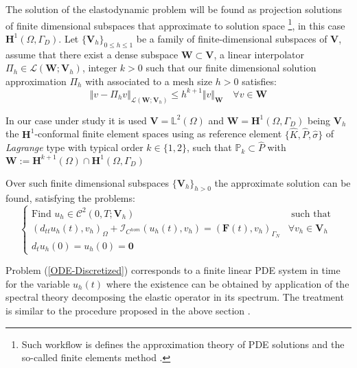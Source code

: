 The solution of the elastodynamic problem will be found as projection solutions of finite dimensional subspaces that approximate to solution space \footnote{Such workflow is defines the approximation theory of PDE solutions and the so-called finite elements method \cite{ern2004theory}.}, in this case $\mathbf{H}^1(\Omega, \Gamma_D)$.
Let $\{\mathbf{V}_h \}_{0 \leq h \leq 1}$ be a family of finite-dimensional subspaces of $\mathbf{V}$, assume that there exist a dense subspace $\mathbf{W} \subset \mathbf{V}$, a linear interpolator $\Pi_h \in \mathcal{L}(\mathbf{W};\mathbf{V}_h)$, integer $k > 0$ such that our finite dimensional solution approximation $\Pi_{h} $ with associated to a mesh size $h>0$ satisfies:
\begin{equation*}
    \Vert v - \Pi_h v \Vert_{\mathcal{L}(\mathbf{W};\mathbf{V}_h)} \leq h^{k+1} \Vert v \Vert_{\mathbf{W}} \quad \forall v \in \mathbf{W}
\end{equation*}
\begin{rem}
In our case under study it is used $\mathbf{V} = \mathbb{L}^2(\Omega)$ and $\mathbf{W} = \mathbf{H}^1(\Omega, \Gamma_D)$ being $\mathbf{V}_h$ the $\mathbf{H}^1$-conformal finite element spaces using as reference element $\{ \hat{K}, \hat{P}, \hat{\sigma} \}$ of \textit{Lagrange} type with typical order $k \in \{1,2\}$, such that $\mathbb{P}_k \subset \hat{P}$ with $\mathbf{W} := \mathbf{H}^{k+1}(\Omega) \cap \mathbf{H}^1(\Omega, \Gamma_D)$
\end{rem}

Over such finite dimensional subspaces $\{ \mathbf{V}_h\}_{h>0}$ the approximate solution can be found, satisfying the problems:
\begin{equation}
\label{ODE-Discretized}
    \left \{
    \begin{array}{cc}
        \text{Find } u_h \in \mathcal{C}^2(0,T; \mathbf{V}_h) & \text{ such that } \\
        (d_{tt} u_h(t), v_h)_{\Omega} + \mathcal{I}_{C^{hom}}(u_h(t), v_h) = (\mathbf{F}(t), v_h)_{\Gamma_N} & \forall v_h \in \mathbf{V}_h\\
        d_t u_h(0) = u_h(0) = \mathbf{0} & 
    \end{array}
    \right. 
\end{equation}

Problem (\ref{ODE-Discretized}) corresponds to a finite linear PDE system in time for the variable $u_h(t)$ where the existence can be obtained by application of the spectral theory decomposing the elastic operator in its spectrum. The treatment is similar to the procedure proposed in the above section \cite{raviart1983introduction}.

